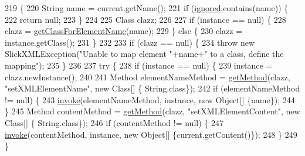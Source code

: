 \begin{DoxyCode}
219                                                                                           \{
220         String name = current.getName();
221         \textcolor{keywordflow}{if} (\mbox{\hyperlink{classorg_1_1newdawn_1_1slick_1_1util_1_1xml_1_1_object_tree_parser_ac7fe7d041a44835a28a1f7effaf03410}{ignored}}.contains(name)) \{
222             \textcolor{keywordflow}{return} null;
223         \}
224         
225         Class clazz;
226         
227         \textcolor{keywordflow}{if} (instance == null) \{
228             clazz = \mbox{\hyperlink{classorg_1_1newdawn_1_1slick_1_1util_1_1xml_1_1_object_tree_parser_a0c4c72b306807c49a12e60724c0eddb3}{getClassForElementName}}(name);
229         \} \textcolor{keywordflow}{else} \{
230             clazz = instance.getClass();
231         \}
232         
233         \textcolor{keywordflow}{if} (clazz == null) \{
234             \textcolor{keywordflow}{throw} \textcolor{keyword}{new} SlickXMLException(\textcolor{stringliteral}{"Unable to map element "}+name+\textcolor{stringliteral}{" to a class, define the mapping"});
235         \}
236         
237         \textcolor{keywordflow}{try} \{
238             \textcolor{keywordflow}{if} (instance == null) \{
239                 instance = clazz.newInstance();
240                 
241                 Method elementNameMethod = \mbox{\hyperlink{classorg_1_1newdawn_1_1slick_1_1util_1_1xml_1_1_object_tree_parser_a6d75c7a61198e54be45a307a9815c583}{getMethod}}(clazz, \textcolor{stringliteral}{"setXMLElementName"}, \textcolor{keyword}{new} Class[] \{
      String.class\});
242                 \textcolor{keywordflow}{if} (elementNameMethod != null) \{
243                     \mbox{\hyperlink{classorg_1_1newdawn_1_1slick_1_1util_1_1xml_1_1_object_tree_parser_a0c4e621ec62be84ee45a12a99714aa64}{invoke}}(elementNameMethod, instance, \textcolor{keyword}{new} Object[] \{name\});
244                 \}
245                 Method contentMethod = \mbox{\hyperlink{classorg_1_1newdawn_1_1slick_1_1util_1_1xml_1_1_object_tree_parser_a6d75c7a61198e54be45a307a9815c583}{getMethod}}(clazz, \textcolor{stringliteral}{"setXMLElementContent"}, \textcolor{keyword}{new} Class[] \{
      String.class\});
246                 \textcolor{keywordflow}{if} (contentMethod != null) \{
247                     \mbox{\hyperlink{classorg_1_1newdawn_1_1slick_1_1util_1_1xml_1_1_object_tree_parser_a0c4e621ec62be84ee45a12a99714aa64}{invoke}}(contentMethod, instance, \textcolor{keyword}{new} Object[] \{current.getContent()\});
248                 \}
249             \}

\end{DoxyCode}
